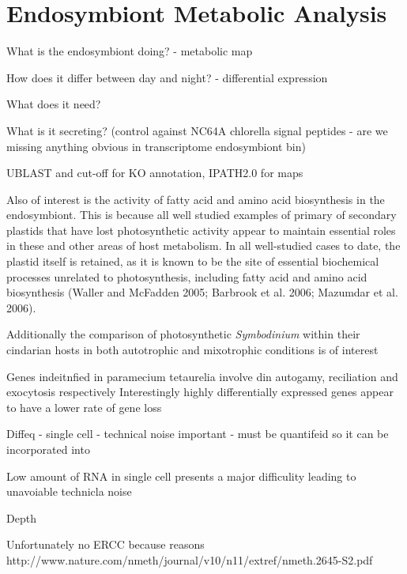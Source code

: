 \graphicspath{{chapters/6.Chapter_4/figures}}

\chapter{Endosymbiont Metabolic Analysis}

What is the endosymbiont doing? - metabolic map

How does it differ between day and night? - differential expression

What does it need?

What is it secreting? (control against NC64A chlorella signal peptides - are we missing anything obvious in transcriptome endosymbiont bin)






UBLAST and cut-off for KO annotation, IPATH2.0 for maps  \citep{Wisecaver2014}




Also of interest is the activity of fatty acid and amino acid biosynthesis in the endosymbiont.  This is because
all well studied examples of primary of secondary plastids that have lost photosynthetic activity appear to maintain 
essential roles in these and other areas of host metabolism.
In all well-studied cases to date, the plastid itself is retained, as it is known to be the site of essential biochemical processes unrelated to photosynthesis, including fatty acid and amino acid biosynthesis (Waller and McFadden 2005; Barbrook et al. 2006; Mazumdar et al. 2006). \citep{Donaher2009}



Additionally the comparison of photosynthetic \textit{Symbodinium} within their cindarian hosts in both autotrophic and mixotrophic conditions
is of interest \citep{Xiang2015}


Genes indeitnfied in paramecium tetaurelia involve din autogamy, reciliation and exocytosis respectively \citep{Arnaiz2010}
Interestingly highly differentially expressed genes appear to have a lower rate of gene loss \citep{Arnaiz2010}




Diffeq - single cell - technical noise important - must be quantifeid so it can be incorporated into 

Low amount of RNA in single cell presents a major difficulity leading to unavoiable technicla noise \citep{Brennecke2013}

Depth


Unfortunately no ERCC because reasons
http://www.nature.com/nmeth/journal/v10/n11/extref/nmeth.2645-S2.pdf




